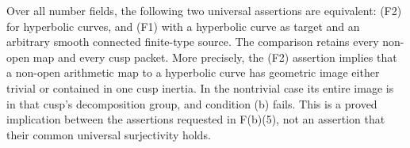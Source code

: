 \begin{proposition}
\label{F-full-curve-reduction}
Over all number fields, the following two universal assertions
are equivalent: (F2) for hyperbolic curves, and (F1) with a
hyperbolic curve as target and an arbitrary smooth connected
finite-type source. The comparison retains every non-open map
and every cusp packet. More precisely, the (F2) assertion implies
that a non-open arithmetic map to a hyperbolic curve has
geometric image either trivial or contained in one cusp inertia.
In the nontrivial case its entire image is in that cusp's
decomposition group, and condition (b) fails. This is a proved
implication between the assertions requested in F(b)(5), not
an assertion that their common universal surjectivity holds.
\end{proposition}

